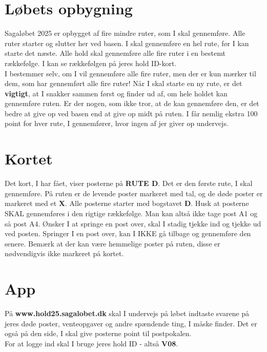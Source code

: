 \section{Løbets opbygning}
Sagaløbet 2025 er opbygget af fire mindre ruter, som I skal gennemføre. Alle ruter starter og slutter her ved basen. I skal gennemføre en hel rute, før I kan starte det næste. Alle hold skal gennemføre alle fire ruter i en bestemt rækkefølge. I kan se rækkefølgen på jeres hold ID-kort.\\\newline
I bestemmer selv, om I vil gennemføre alle fire ruter, men der er kun mærker til dem, som har gennemført alle fire ruter! Når I skal starte en ny rute, er det \textbf{vigtigt}, at I snakker sammen først og finder ud af, om hele holdet kan gennemføre ruten. Er der nogen, som ikke tror, at de kan gennemføre den, er det bedre at give op ved basen end at give op midt på ruten. I får nemlig ekstra 100 point for hver rute, I gennemfører, hvor ingen af jer giver op undervejs.\\
\section{Kortet}
Det kort, I har fået, viser posterne på \textbf{RUTE D}. Det er den første rute, I skal gennemføre. På ruten er de levende poster markeret med tal, og de døde poster er markeret med et \textbf{X}. Alle posterne starter med bogstavet \textbf{D}. Husk at posterne SKAL gennemføres i den rigtige rækkefølge. Man kan altså ikke tage post A1 og så post A4. Ønsker I at springe en post over, skal I stadig tjekke ind og tjekke ud ved posten. Springer I en post over, kan I IKKE gå tilbage og gennemføre den senere. Bemærk at der kan være hemmelige poster på ruten, disse er nødvendigvis ikke markeret på kortet.
\section{App}
På \textbf{www.hold25.sagalobet.dk} skal I undervejs på løbet indtaste svarene på jeres døde poster, venteopgaver og andre spændende ting, I måske finder. Det er også på den side, I skal give posterne point til postpokalen.\\
For at logge ind skal I bruge jeres hold ID - altså \textbf{V08}.
\newpage
